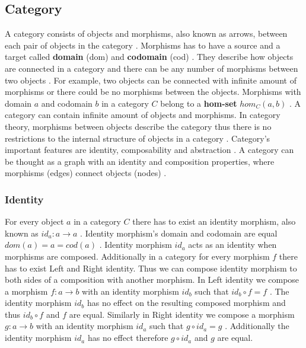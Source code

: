 \documentclass[article]{aaltoseries}
\begin{document}

  \subsection{Category}
  A category consists of objects and morphisms, also known as arrows, between
  each pair of objects in the category \cite{barr1990category,
    mac2013categories}. Morphisms has to have a source and a target called
  \textbf{domain} (dom) and \textbf{codomain} (cod) \cite{awodey2006category,
    barr1990category, mac2013categories}. They describe how objects are
  connected in a category and there can be any number of morphisms between two
  objects \cite{computational, barr1990category}. For example, two objects can
  be connected with infinite amount of morphisms or there could be no morphisms
  between the objects. Morphisms with domain $a$ and codomain $b$ in a category
  $C$ belong to a \textbf{hom-set} $hom_C(a, b)$ \cite{mac2013categories,
    barr1990category}. A category can contain infinite amount of objects and
  morphisms. In category theory, morphisms between objects describe the category
  thus there is no restrictions to the internal structure of objects in a
  category \cite{computational}. Category’s important features are identity,
  composability and abstraction \cite{barr1990category, awodey2006category}. A
  category can be thought as a graph with an identity and composition
  properties, where morphisms (edges) connect objects (nodes)
  \cite{barr1990category}.


  \subsubsection{Identity}
    For every object $a$ in a category $C$ there has to exist an identity
    morphism, also known as $id_a: a \rightarrow a$ \cite{mac2013categories,
      computational}. Identity morphism’s domain and codomain are equal $dom(a)
    = a = cod(a)$ \cite{mac2013categories}. Identity morphism $id_a$ acts as an
    identity when morphisms are composed. Additionally in a category for every
    morphism $f$ there has to exist Left and Right identity. Thus we can compose
    identity morphism to both sides of a composition with another morphism. In
    Left identity we compose a morphism $f: a \rightarrow b$ with an identity morphism $id_b$
    such that $id_b \circ f = f$ \cite{computational, barr1990category}. The identity
    morphism $id_b$ has no effect on the resulting composed morphism and thus $id_b \circ
    f$ and $f$ are equal. Similarly in Right identity we compose a morphism $g: a \rightarrow
    b$ with an identity morphism $id_a$ such that $g \circ id_a = g$ \cite{computational,
      barr1990category}. Additionally the identity morphism $id_a$ has no effect
    therefore $g \circ id_a$ and $g$ are equal.
 
\end{document}
